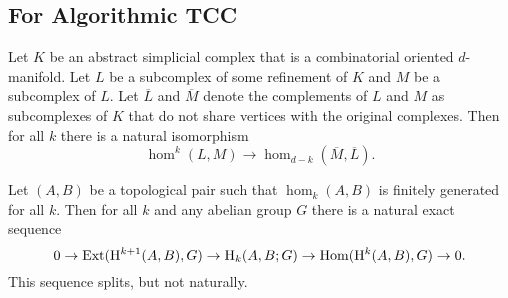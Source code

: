 \subsection{For Algorithmic TCC}

\begin{theorem}\label{thm:alexander}
  Let $K$ be an abstract simplicial complex that is a combinatorial oriented $d$-manifold.
  Let $L$ be a subcomplex of some refinement of $K$ and $M$ be a subcomplex of $L$.
  Let $\overline{L}$ and $\overline{M}$ denote the complements of $L$ and $M$ as subcomplexes of $K$ that do not share vertices with the original complexes.
  Then for all $k$ there is a natural isomorphism
  \[ \hom^k(L, M)\to \hom_{d-k}(\overline{M},\overline{L}). \]
\end{theorem}



\begin{theorem}\label{thm:univ_coef}
  Let $(A,B)$ be a topological pair such that $\hom_k(A, B)$ is finitely generated for all $k$.
  Then for all $k$ and any abelian group $G$ there is a natural exact sequence
  \[ 0\to\mathrm{Ext}(\mathrm{H}^{k+1}(A, B), G)\to \mathrm{H}_k(A, B; G)\to \mathrm{Hom}(\mathrm{H}^k(A, B), G)\to 0.\]
  This sequence splits, but not naturally.
\end{theorem}

